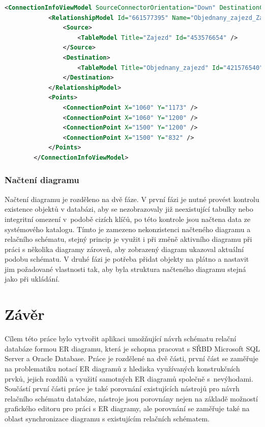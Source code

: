 \documentclass[czech,bachelor,public,dept460,male,oneside]{diploma}
\begin{document}
		\begin{lstlisting}[language=xml,label=src:xmlFk,caption=Serializovaný vztah ve formátu XML]
		<ConnectionInfoViewModel SourceConnectorOrientation="Down" DestinationConnectorOrientation="Down">
			<RelationshipModel Id="661577395" Name="Objednany_zajezd_Zajezd_FK" LastModified="2017-01-21T15:17:53.68">
				<Source>
					<TableModel Title="Zajezd" Id="453576654" />
				</Source>
				<Destination>
					<TableModel Title="Objednany_zajezd" Id="421576540" />
				</Destination>
			</RelationshipModel>
			<Points>
				<ConnectionPoint X="1060" Y="1173" />
				<ConnectionPoint X="1060" Y="1200" />
				<ConnectionPoint X="1500" Y="1200" />
				<ConnectionPoint X="1500" Y="832" />
			</Points>
		</ConnectionInfoViewModel>
		\end{lstlisting}
		
		\subsubsection{Načtení diagramu}
		Načtení diagramu je rozděleno na dvě fáze. V první fázi je nutné provést kontrolu existence objektů v databázi, aby se nezobrazovaly již neexistující tabulky nebo integritní omezení v~podobě cizích klíčů, po této kontrole jsou načtena data ze systémového katalogu. Tímto je zamezeno nekonzistenci načteného diagramu a relačního schématu, stejný princip je využit i při změně aktivního diagramu při práci s několika diagramy zároveň, aby zobrazený diagram ukazoval aktuální podobu schématu. V druhé fázi je potřeba přidat objekty na plátno a nastavit jim požadované vlastnosti tak, aby byla struktura načteného diagramu stejná jako při ukládání.

\newpage
\section{Závěr}
Cílem této práce bylo vytvořit aplikaci umožňující návrh schématu relační databáze formou ER diagramu, která je schopna pracovat s SŘBD Microsoft SQL Server a Oracle Database. Práce je rozdělené na dvě části, první část se zaměřuje na problematiku notací ER diagramů z hlediska využívaných konstrukčních prvků, jejich rozdílů a využití samotných ER diagramů společně s~nevýhodami. Součástí první části práce je také porovnání existujících nástrojů pro návrh relačního schématu databáze, nástroje jsou porovnány nejen na základě možností grafického editoru pro práci s ER diagramy, ale porovnání se zaměřuje také na oblast synchronizace diagramu s existujícím relačních schématem.
\end{document}
